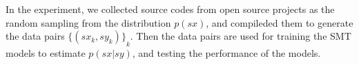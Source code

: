\documentclass[senior,final,11pt]{iscs-thesis}
\newcommand{\argmax}{\mathop{\rm arg\,max}\limits}
\begin{document}
In the experiment, we collected source codes from open source projects as the random sampling from the distribution $ p(sx) $, 
and compileded them to generate the data pairs $ {\{(sx_k,sy_k)\}}_k $.
Then the data pairs are used for training the SMT models to estimate $p(sx|sy)$, and testing the performance of the models.




\end{document}

